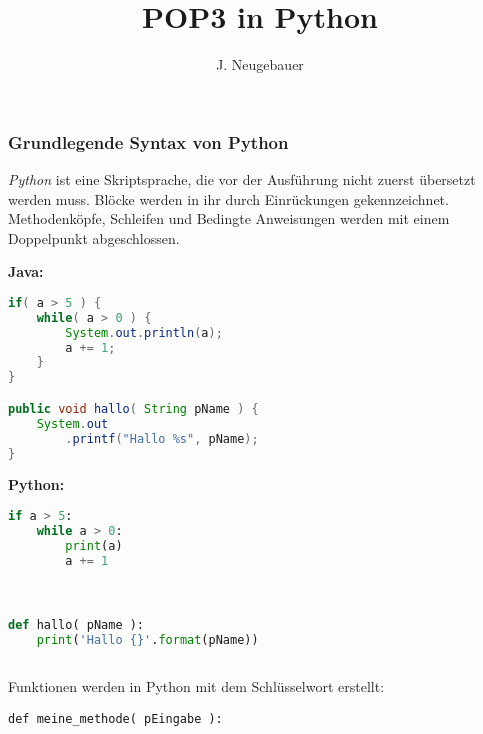 \documentclass[10pt, a4paper]{scrartcl}
\author{J. Neugebauer}
\title{POP3 in Python}
\date{\Heute}
\begin{document}
\ReiheTitel

\begin{infobox}
	\subsubsection*{Grundlegende Syntax von Python}
	\emph{Python} ist eine Skriptsprache, die vor der Ausführung nicht zuerst übersetzt werden muss. Blöcke werden in ihr durch Einrückungen gekennzeichnet. Methodenköpfe, Schleifen und Bedingte Anweisungen werden mit einem Doppelpunkt abgeschlossen.
	
	\medskip
	\begin{minipage}{.5\textwidth}
\textbf{Java:}

\begin{lstlisting}[language=Java,numbers=none,tabsize=2]
if( a > 5 ) {
	while( a > 0 ) {
		System.out.println(a);
		a += 1;
	}
}

public void hallo( String pName ) {
	System.out
		.printf("Hallo %s", pName);
}
\end{lstlisting}
	\end{minipage}\hfill\begin{minipage}{.45\textwidth}
\textbf{Python:}

\begin{lstlisting}[language=Python,numbers=none,tabsize=2,showlines=true]
if a > 5:
	while a > 0:
		print(a)
		a += 1



def hallo( pName ):
	print('Hallo {}'.format(pName))
	

\end{lstlisting}
	\end{minipage}

	Funktionen werden in Python mit dem  Schlüsselwort erstellt:
	
	\verb|def meine_methode( pEingabe ):|
	

\end{infobox}
\end{document}
